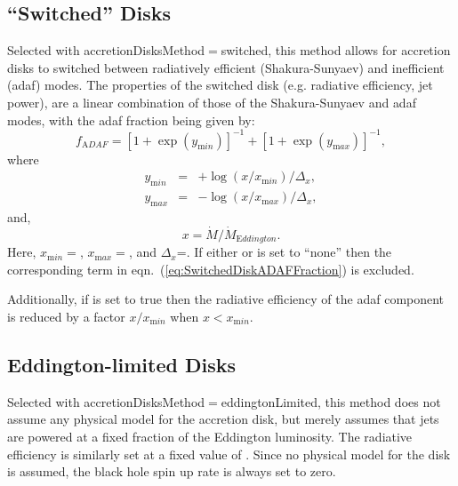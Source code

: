 \subsection{``Switched'' Disks}

Selected with {\normalfont \ttfamily accretionDisksMethod}$=${\normalfont \ttfamily switched}, this method allows for accretion disks to switched between radiatively efficient (Shakura-Sunyaev) and inefficient (\gls{adaf}) modes. The properties of the switched disk (e.g. radiative efficiency, jet power), are a linear combination of those of the Shakura-Sunyaev and \gls{adaf} modes, with the \gls{adaf} fraction being given by:
\begin{equation}
f_{\mathrm ADAF} = [1+\exp(y_{\mathrm min})]^{-1} + [1+\exp(y_{\mathrm max})]^{-1},
\label{eq:SwitchedDiskADAFFraction}
\end{equation}
where
\begin{eqnarray}
y_{\mathrm min} &=& +\log(x/x_{\mathrm min})/\Delta_{x}, \\
y_{\mathrm max} &=& -\log(x/x_{\mathrm max})/\Delta_{x},
\end{eqnarray}
and,
\begin{equation}
x = \dot{M} / \dot{M}_{\mathrm Eddington}.
\end{equation}
Here, $x_{\mathrm min}=${\normalfont \ttfamily [accretionRateThinDiskMinimum]}, $x_{\mathrm max}=${\normalfont \ttfamily [accretionRateThinDiskMaximum]}, and $\Delta_{x}$={\normalfont \ttfamily [accretionRateTransitionWidth]}. If either {\normalfont \ttfamily [accretionRateThinDiskMinimum]} or {\normalfont \ttfamily [accretionRateThinDiskMaximum]} is set to ``{\normalfont \ttfamily none}'' then the corresponding term in eqn.~(\ref{eq:SwitchedDiskADAFFraction}) is excluded.

Additionally, if {\normalfont \ttfamily [accretionDiskSwitchedScaleAdafRadiativeEfficiency]} is set to {\normalfont \ttfamily true} then the radiative efficiency of the \gls{adaf} component is reduced by a factor $x/x_{\mathrm min}$ when $x<x_{\mathrm min}$.

\subsection{Eddington-limited Disks}

Selected with {\normalfont \ttfamily accretionDisksMethod}$=${\normalfont \ttfamily eddingtonLimited}, this method does not assume any physical model for the accretion disk, but merely assumes that jets are powered at a fixed fraction {\normalfont \ttfamily [accretionDiskJetPowerEddington]} of the Eddington luminosity. The radiative efficiency is similarly set at a fixed value of {\normalfont \ttfamily [accretionDiskRadiativeEfficiencyEddington]}. Since no physical model for the disk is assumed, the black hole spin up rate is always set to zero.

